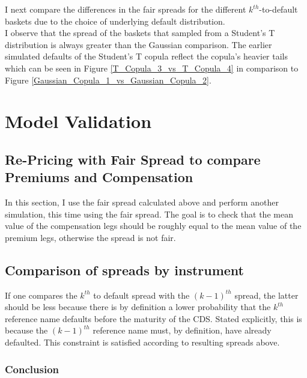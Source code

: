 \documentclass{report}
\theoremstyle{plain}
\theoremstyle{definition}
\begin{document}
I next compare the differences in the fair spreads for the different $k^{th}$-to-default baskets due to the choice of underlying default distribution.\\


I observe that the spread of the baskets that sampled from a Student's T distribution is always greater than the Gaussian comparison. The earlier simulated defaults of the Student's T copula reflect the copula's heavier tails which can be seen in Figure \ref{T_Copula_3_vs_T_Copula_4} in comparison to Figure \ref{Gaussian_Copula_1_vs_Gaussian_Copula_2}.


\chapter{Model Validation}

\section{Re-Pricing with Fair Spread to compare Premiums and Compensation}
In this section, I use the fair spread calculated above and perform another simulation, this time using the fair spread. The goal is to check that the mean value of the compensation legs should be roughly equal to the mean value of the premium legs, otherwise the spread is not fair.

\section{Comparison of spreads by instrument}
If one compares the $k^{th}$ to default spread with the $(k-1)^{th}$ spread, the latter should be less because there is by definition a lower probability that the $k^{th}$ reference name defaults before the maturity of the CDS. Stated explicitly, this is because the $(k-1)^{th}$ reference name must, by definition, have already defaulted. This constraint is satisfied according to resulting spreads above.






\subsection*{Conclusion}
\end{document}
